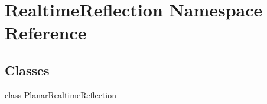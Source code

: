 \hypertarget{namespace_realtime_reflection}{}\section{Realtime\+Reflection Namespace Reference}
\label{namespace_realtime_reflection}
\subsection*{Classes}
\begin{DoxyCompactItemize}
\item 
class \mbox{\hyperlink{class_realtime_reflection_1_1_planar_realtime_reflection}{Planar\+Realtime\+Reflection}}
\end{DoxyCompactItemize}
